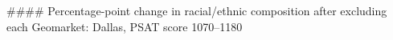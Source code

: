 #### Percentage-point change in racial/ethnic composition after excluding each Geomarket: Dallas, PSAT score 1070–1180

